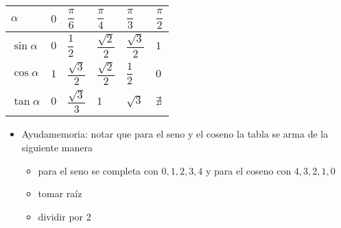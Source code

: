 \documentclass[letterpaper,11pt]{article}
\begin{document}
\begin{table}[h!]
    \centering
    \begin{tabular}{m{2em}||m{2em}|m{2em}|m{2em}|m{2em}|m{2em}|}
         $\alpha$ & $0$ & $\dfrac{\pi}{6}$ & $\dfrac{\pi}{4}$ & $\dfrac{\pi}{3}$ & $\dfrac{\pi}{2}$\\[2ex] \hline
         $\sin\alpha$ & $0$ & $\dfrac{1}{2}$ & $\dfrac{\sqrt{2}}{2}$ & $\dfrac{\sqrt{3}}{2}$ & $1$\\[3ex] 
         $\cos\alpha$ & $1$ & $\dfrac{\sqrt{3}}{2}$ & $\dfrac{\sqrt{2}}{2}$ & $\dfrac{1}{2}$ & $0$ \\[3ex] 
         $\tan\alpha$ & $0$ & $\dfrac{\sqrt{3}}{3}$ & $1$ & $\sqrt{3}$ & $\nexists$
    \end{tabular}
\end{table}
\begin{itemize}
    \item Ayudamemoria: notar que para el seno y el coseno la tabla se arma de la siguiente manera
    \begin{itemize}
        \item para el seno se completa con $0,1,2,3,4$ y para el coseno con $4,3,2,1,0$
        \item tomar raíz 
        \item dividir por 2
    \end{itemize}
\end{itemize}
\end{document}
